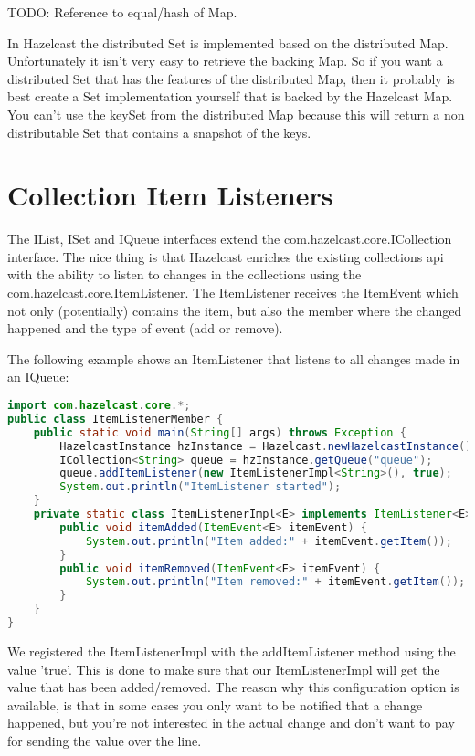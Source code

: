 TODO: Reference to equal/hash of Map.

In Hazelcast the distributed Set is implemented based on the distributed Map. Unfortunately it isn't very easy to retrieve the backing Map. So if you want a distributed Set that has the features of the distributed Map, then it probably is best create a Set implementation yourself that is backed by the Hazelcast Map. You can't use the keySet from the distributed Map because this will return a non distributable Set that contains a snapshot of the keys.

\section{Collection Item Listeners}
The IList, ISet and IQueue interfaces extend the com.hazelcast.core.ICollection interface. The nice thing is that Hazelcast enriches the existing collections api with the ability to listen to changes in the collections using the com.hazelcast.core.ItemListener. The ItemListener receives the ItemEvent which not only (potentially) contains the item, but also the member where the changed happened and the type of event (add or remove).

The following example shows an ItemListener that listens to all changes made in an IQueue:
\begin{lstlisting}[language=java]
import com.hazelcast.core.*;
public class ItemListenerMember {
    public static void main(String[] args) throws Exception {
        HazelcastInstance hzInstance = Hazelcast.newHazelcastInstance();
        ICollection<String> queue = hzInstance.getQueue("queue");
        queue.addItemListener(new ItemListenerImpl<String>(), true);
        System.out.println("ItemListener started");
    }
    private static class ItemListenerImpl<E> implements ItemListener<E> {
        public void itemAdded(ItemEvent<E> itemEvent) {
            System.out.println("Item added:" + itemEvent.getItem());
        }
        public void itemRemoved(ItemEvent<E> itemEvent) {
            System.out.println("Item removed:" + itemEvent.getItem());
        }
    }
}
\end{lstlisting}
We registered the ItemListenerImpl with the addItemListener method using the value 'true'. This is done to make sure that our ItemListenerImpl will get the value that has been added/removed. The reason why this configuration option is available, is that in some cases you only want to be notified that a change happened, but you're not interested in the actual change and don't want to pay for sending the value over the line.


